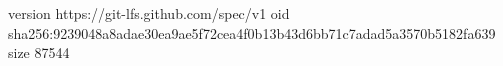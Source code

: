 version https://git-lfs.github.com/spec/v1
oid sha256:9239048a8adae30ea9ae5f72cea4f0b13b43d6bb71c7adad5a3570b5182fa639
size 87544
